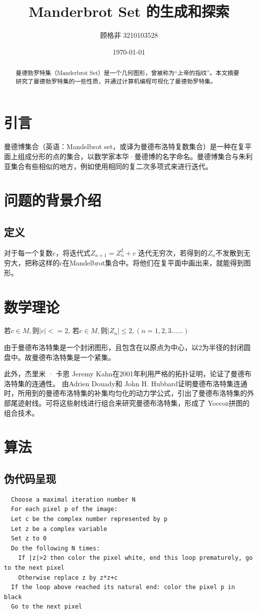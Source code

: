 \documentclass{ctexart}
\title{\vspace{-2.5cm}Manderbrot Set 的生成和探索}
\author{顾格非 3210103528}
\date{\today}
\begin{document}
\maketitle  
\vspace{-0,5cm}
\begin{abstract}
曼德勃罗特集（Manderbrot Set）是一个几何图形，曾被称为“上帝的指纹”。本文摘要研究了曼德勃罗特集的一些性质，并通过计算机编程可视化了曼德勃罗特集。
\end{abstract}
\section{引言}
曼德博集合\cite{branner1989mandelbrot}（英语：Mandelbrot set，或译为曼德布洛特复数集合）是一种在复平面上组成分形的点的集合，以数学家本华·曼德博的名字命名。曼德博集合与朱利亚集合有些相似的地方，例如使用相同的复二次多项式来进行迭代。
\section{问题的背景介绍}
\subsection{定义}
对于每一个复数c，将迭代式$Z_{n+1}=Z_n^2+c$ 迭代无穷次，若得到的$Z_n$不发散到无穷大，把称这样的c在Mandelbrot集合中。将他们在复平面中画出来，就能得到图形\cite{stauffer1996newton}。

\section{数学理论}
若$c\in M,$则$|c|<=2$, 
若$c\in M,$则$|Z_n|\leq2,(n=1,2,3……)$

由于曼德布洛特集是一个封闭图形，且包含在以原点为中心，以2为半径的封闭圆盘中。故曼德布洛特集是一个紧集。

此外，杰里米 · 卡恩 Jeremy Kahn在2001年利用严格的拓扑证明，论证了曼德布洛特集的连通性。
由Adrien Douady和 John H. Hubbard证明曼德布洛特集连通时，所用到的曼德布洛特集的补集均匀化的动力学公式，引出了曼德布洛特集的外部尾迹射线。可将这些射线进行组合来研究曼德布洛特集，形成了 Yoccoz拼图的组合技术。
\newpage
\section{\vspace{-0.3cm}算法}
\subsection{伪代码呈现}
\begin{lstlisting}
  Choose a maximal iteration number N
  For each pixel p of the image:
  Let c be the complex number represented by p
  Let z be a complex variable
  Set z to 0
  Do the following N times:    
    If |z|>2 then color the pixel white, end this loop prematurely, go to the next pixel
    Otherwise replace z by z*z+c
  If the loop above reached its natural end: color the pixel p in black
  Go to the next pixel
\end{lstlisting}
\end{document}

